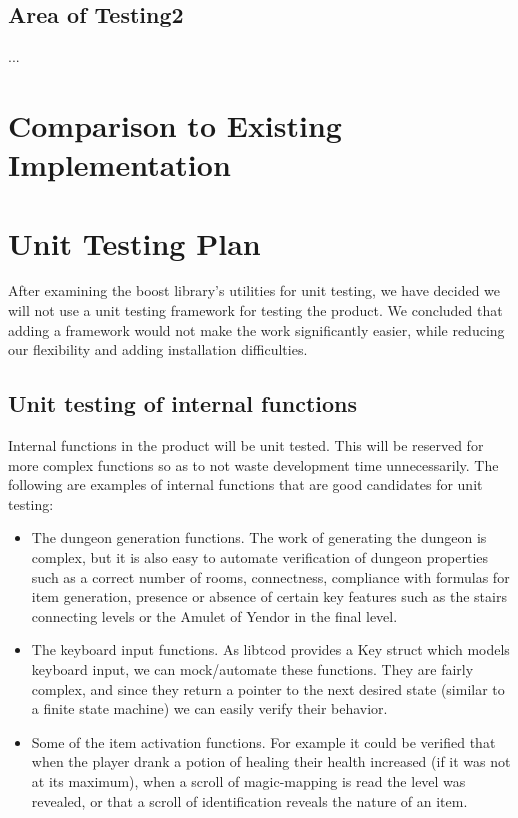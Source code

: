 \documentclass[12pt, titlepage]{article}
\begin{document}
	\subsection{Area of Testing2}

	...

\section{Comparison to Existing Implementation}	

	

\section{Unit Testing Plan}
	
	After examining the boost library's utilities for unit testing, we have decided we will not use a unit testing framework for testing the product. We concluded that adding a framework would not make the work significantly easier, while reducing our flexibility and adding installation difficulties.
	
	\subsection{Unit testing of internal functions}
		Internal functions in the product will be unit tested. This will be reserved for more complex functions so as to not waste development time unnecessarily. The following are examples of internal functions that are good candidates for unit testing:
		\begin{itemize}
			\item The dungeon generation functions. The work of generating the dungeon is complex, but it is also easy to automate verification of dungeon properties such as a correct number of rooms, connectness, compliance with formulas for item generation, presence or absence of certain key features such as the stairs connecting levels or the Amulet of Yendor in the final level.
			\item The keyboard input functions. As libtcod provides a Key struct which models keyboard input, we can mock/automate these functions. They are fairly complex, and since they return a pointer to the next desired state (similar to a finite state machine) we can easily verify their behavior.
			\item Some of the item activation functions. For example it could be verified that when the player drank a potion of healing their health increased (if it was not at its maximum), when a scroll of magic-mapping is read the level was revealed, or that a scroll of identification reveals the nature of an item.
		\end{itemize}
\end{document}

